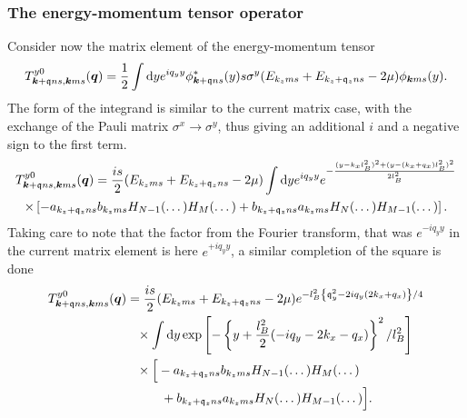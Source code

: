 \subsubsection{The energy-momentum tensor operator}
Consider now the matrix element of the energy-momentum tensor
\begin{equation}
\label{eq:75}
T^{y 0}_{\bm{k}+\mathfrak{q}ns, \bm{k}ms} (\bm{q})
=
\frac{1}{2}
\int \mathrm{d}y e^{iq_y y}
\phi ^* _{\bm{k}+\mathfrak{q} ns}(y) s \sigma ^y (E_{k_z m s} + E_{k_z+\mathfrak{q}_z n s}- 2\mu )
\phi _{\bm{k} ms}(y).
\end{equation}
The form of the integrand is similar to the current matrix case, with the exchange of the Pauli matrix $\sigma ^x \to \sigma ^y$, thus giving an additional $i$ and a negative sign to the first term.
{
\setlength\multlinegap{0pt}  %
\begin{multline}
T^{y 0}_{\bm{k}+\mathfrak{q}ns, \bm{k}ms} (\bm{q})
  = \frac{i s}{2}
    (E_{k_z m s} + E_{k_z+\mathfrak{q}_z n s}- 2\mu )
    \int \mathrm{d}y e^{iq_y y} e^{- \frac{(y-k_xl_B^2)^2 + (y-(k_x + q_x) l_B^2)^2}{2 l_B^2}}\\
    \times \left[
    - a_{k_z+\mathfrak{q}_z ns} b_{k_z ms} H_{N-1} (\dots ) H_M(\dots )
    + b_{k_z+\mathfrak{q}_z ns} a_{k_zms} H_N(\dots ) H_{M-1}(\dots )
    \right].
\end{multline}
}
Taking care to note that the factor from the Fourier transform, that was $e^{-iq_y y}$ in the current matrix element is here $e^{+ i q_y y}$, a similar completion of the square is done
\begin{equation}
  \begin{split}
    T^{y 0}_{\vec{k}+\qvec{q}ns, \vec{k}ms} (\vec{q}) &=
    \frac{i s}{2}
    (E_{k_z m s} + E_{k_z+\qvec{q}_z n s}- 2\mu )
      e^{
      -l_B^2 \left\{ \qvec{q}_y^2 - 2 i q_y (2 k_x + q_x) \right\} /4
      }\\
    &\pe \times \int \mathrm{d}y
    \exp \left[
      -\left\{ y + \frac{l_B^2}{2} (-iq_y - 2 k_x - q_x) \right\}^2 / l_B^2
    \right]\\
    &\pe
      \begin{multlined}[t]
        \times \Big[
        - a_{k_z+\qvec{q}_z ns} b_{k_z ms} H_{N-1} (\dots ) H_M(\dots )\\
        + b_{k_z+\qvec{q}_z ns} a_{k_zms} H_N(\dots ) H_{M-1}(\dots )
        \Big].
      \end{multlined}
  \end{split}
\end{equation}

